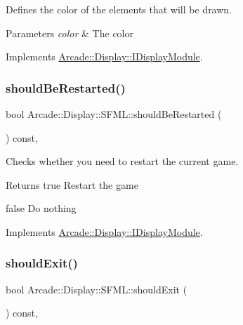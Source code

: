 Defines the color of the elements that will be drawn. 


\begin{DoxyParams}{Parameters}
{\em color} & The color \\
\hline
\end{DoxyParams}


Implements \mbox{\hyperlink{classArcade_1_1Display_1_1IDisplayModule_a9f81148f93a249d6fc91307819911b4e}{Arcade\+::\+Display\+::\+I\+Display\+Module}}.

\mbox{\label{classArcade_1_1Display_1_1SFML_a7c276ccbf48700092eb637d73b78e0d1}} 
\subsubsection{\texorpdfstring{shouldBeRestarted()}{shouldBeRestarted()}}
{\footnotesize\ttfamily bool Arcade\+::\+Display\+::\+S\+F\+M\+L\+::should\+Be\+Restarted (\begin{DoxyParamCaption}{ }\end{DoxyParamCaption}) const\hspace{0.3cm}{\ttfamily [final]}, {\ttfamily [virtual]}}



Checks whether you need to restart the current game. 

\begin{DoxyReturn}{Returns}
true Restart the game 

false Do nothing 
\end{DoxyReturn}


Implements \mbox{\hyperlink{classArcade_1_1Display_1_1IDisplayModule_adc5d499229aa5899bbd4bae14f00cb27}{Arcade\+::\+Display\+::\+I\+Display\+Module}}.

\mbox{\label{classArcade_1_1Display_1_1SFML_a780a71713551c8dffd1f008802f96767}} 
\subsubsection{\texorpdfstring{shouldExit()}{shouldExit()}}
{\footnotesize\ttfamily bool Arcade\+::\+Display\+::\+S\+F\+M\+L\+::should\+Exit (\begin{DoxyParamCaption}{ }\end{DoxyParamCaption}) const\hspace{0.3cm}{\ttfamily [final]}, {\ttfamily [virtual]}}



